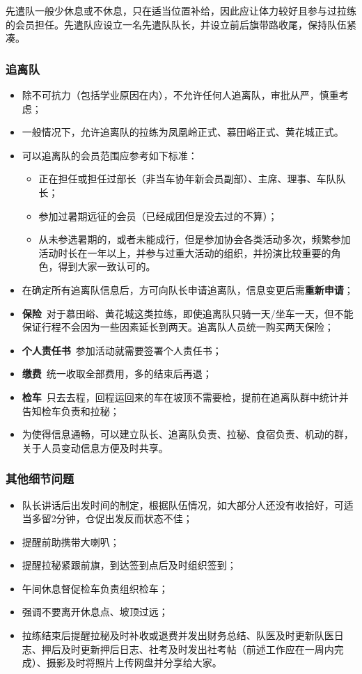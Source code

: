 \documentclass[UTF8]{ctexart}
\begin{document}
先遣队一般少休息或不休息，只在适当位置补给，因此应让体力较好且参与过拉练的会员担任。先遣队应设立一名先遣队队长，并设立前后旗带路收尾，保持队伍紧凑。

\subsubsection{追离队}

\begin{itemize}[nosep,left=2em]
    \item 除不可抗力（包括学业原因在内），不允许任何人追离队，审批从严，慎重考虑；
    \item 一般情况下，允许追离队的拉练为凤凰岭正式、慕田峪正式、黄花城正式。
    \item 可以追离队的会员范围应参考如下标准：
    \begin{itemize}[nosep]
        \item 正在担任或担任过部长（非当车协年新会员副部）、主席、理事、车队队长；
        \item 参加过暑期远征的会员（已经成团但是没去过的不算）；
        \item 从未参选暑期的，或者未能成行，但是参加协会各类活动多次，频繁参加活动时长在一年以上，并参与过重大活动的组织，并扮演比较重要的角色，得到大家一致认可的。
    \end{itemize}
    \item 在确定所有追离队信息后，方可向队长申请追离队，信息变更后需\textbf{重新申请}；
    \item \textbf{保险}\ 对于慕田峪、黄花城这类拉练，即使追离队只骑一天/坐车一天，但不能保证行程不会因为一些因素延长到两天。追离队人员统一购买两天保险；
    \item \textbf{个人责任书}\ 参加活动就需要签署个人责任书；
    \item \textbf{缴费}\ 统一收取全部费用，多的结束后再退；
    \item \textbf{检车}\ 只去去程，回程运回来的车在坡顶不需要检，提前在追离队群中统计并告知检车负责和拉秘；
    \item 为使得信息通畅，可以建立队长、追离队负责、拉秘、食宿负责、机动的群，关于人员变动信息方便及时共享。
\end{itemize}

\subsubsection{其他细节问题}

\begin{itemize}[nosep,left=2em]
    \item 队长讲话后出发时间的制定，根据队伍情况，如大部分人还没有收拾好，可适当多留2分钟，仓促出发反而状态不佳；
    \item 提醒前助携带大喇叭；
    \item 提醒拉秘紧跟前旗，到达签到点后及时组织签到；
    \item 午间休息督促检车负责组织检车；
    \item 强调不要离开休息点、坡顶过远；
    \item 拉练结束后提醒拉秘及时补收或退费并发出财务总结、队医及时更新队医日志、押后及时更新押后日志、社考及时发出社考帖（前述工作应在一周内完成）、摄影及时将照片上传网盘并分享给大家。
\end{itemize}
\end{document}
